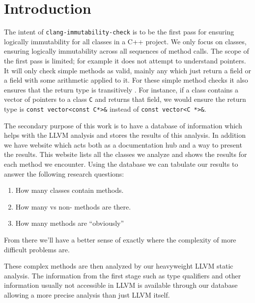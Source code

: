 \chapter{Introduction}

The intent of \verb`clang-immutability-check` is to be the first pass for
ensuring logically immutability for all classes in a C++ project.
We only focus on classes, ensuring logically immutability across all sequences
of method calls.
The scope of the first pass is limited; for example it does not attempt to
understand pointers.
It will only check simple methods as valid, mainly any which just return a field
or a field with some arithmetic applied to it.
For these simple method checks it also ensures that the return type is
transitively \const{}.
For instance, if a class contains a vector of pointers to a class \verb`C` and
returns that field, we would ensure the return type is
\verb`const vector<const C*>&` instead of \verb`const vector<C *>&`.

The secondary purpose of this work is to have a database of information which
helps with the LLVM analysis and stores the results of this analysis.
In addition we have website which acts both as a documentation hub and a way to
present the results.
This website lists all the classes we analyze and shows the results for each
method we encounter.
Using the database we can tabulate our results to answer the following research
questions:

\begin{enumerate}
  \item How many classes contain \const{} methods.
  \item How many \const{} vs non-\const{} methods are there.
  \item How many \const{} methods are ``obviously'' \const{}
\end{enumerate}

From there we'll have a better sense of exactly where the complexity of more
difficult \const{} problems are.

These complex methods are then analyzed by our heavyweight LLVM static analysis.
The information from the first stage such as type qualifiers and other
information usually not accessible in LLVM is available through our database
allowing a more precise analysis than just LLVM itself.

